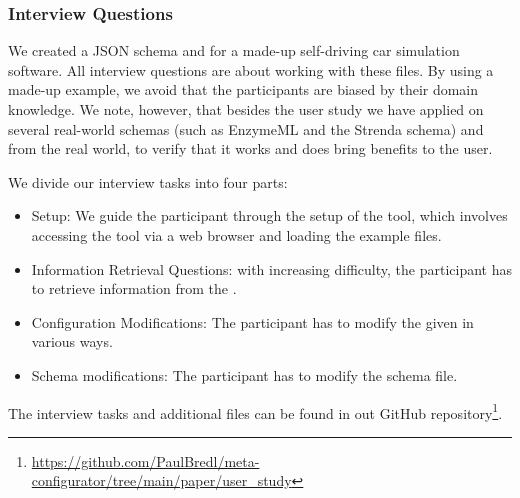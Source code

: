 \subsubsection{Interview Questions}
We created a JSON schema and \cfgfile{} for a made-up self-driving car simulation software.
All interview questions are about working with these files.
By using a made-up example, we avoid that the participants are biased by their domain knowledge.
We note, however, that besides the user study we have applied \toolname{} on several real-world schemas (such as EnzymeML\cite{pyenzyme} and the Strenda schema\cite{strenda}) and \cfgfiles{} from the real world, to verify that it works and does bring benefits to the user.

We divide our interview tasks into four parts:
\begin{itemize}
    \item Setup: We guide the participant through the setup of the tool, which involves accessing the tool via a web browser and loading the example files.
    \item Information Retrieval Questions: with increasing difficulty, the participant has to retrieve information from the \cfgfile{}.
    \item Configuration Modifications: The participant has to modify the given \cfgfile{} in various ways.
    \item Schema modifications: The participant has to modify the schema file.
\end{itemize}

The interview tasks and additional files can be found in out GitHub repository\footnote{\url{https://github.com/PaulBredl/meta-configurator/tree/main/paper/user_study}}.

